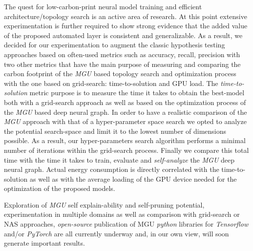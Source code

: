 \documentclass[conference]{IEEEtran}
\begin{document}
The quest for low-carbon-print neural model training and efficient architecture/topology search is an active area of research. At this point extensive experimentation is further required to show strong evidence that the added value of the proposed automated layer is consistent and generalizable. As a result, we decided for our experimentation to augment the classic hypothesis testing approaches based on often-used metrics such as accuracy, recall, precision with two other metrics that have the main purpose of measuring and comparing the carbon footprint of the \textit{MGU} based topology search and optimization process with the one based on grid-search: time-to-solution and GPU load.
The \textit{time-to-solution} metric purpose is to measure the time it takes to obtain the best-model both with a grid-search approach as well as based on the optimization process of the \textit{MGU} based deep neural graph. In order to have a realistic comparison of the \textit{MGU} approach with that of a hyper-parameter space search we opted to analyze the potential search-space and limit it to the lowest number of dimensions possible. As a result, our hyper-parameters search algorithm performs a minimal number of iterations within the grid-search process. Finally we compare this total time with the time it takes to train, evaluate and \textit{self-analyze} the \textit{MGU} deep neural graph. Actual energy consumption is directly correlated with the time-to-solution as well as with the average loading of the GPU device needed for the optimization of the proposed models. 

Exploration of \textit{MGU} self explain-ability and self-pruning potential, experimentation in multiple domains as well as comparison with grid-search or NAS approaches, \textit{open-source} publication of MGU \textit{python} libraries for \textit{Tensorflow} and/or \textit{PyTorch} are all currently underway and, in our own view, will soon generate important results.
\end{document}
